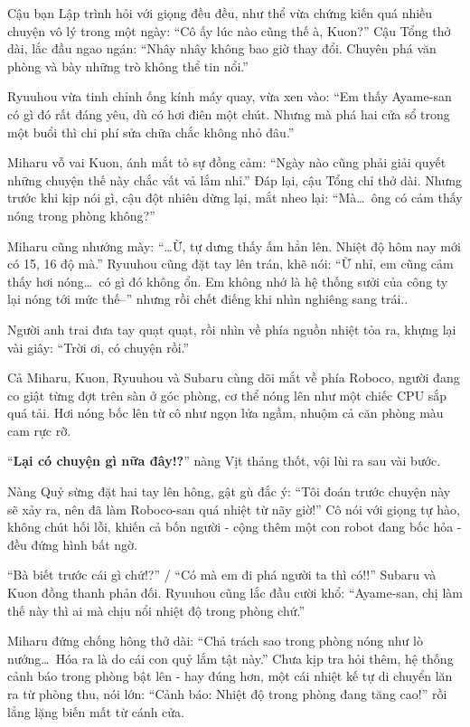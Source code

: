 \documentclass[../main.tex]{subfiles}
\begin{document}

Cậu bạn Lập trình hỏi với giọng đều đều, như thể vừa chứng kiến quá nhiều chuyện vô lý trong một ngày: ``Cô ấy lúc nào cũng thế à, Kuon?'' Cậu Tổng thở dài, lắc đầu ngao ngán: ``Nhây nhây không bao giờ thay đổi. Chuyên phá văn phòng và bày những trò không thể tin nổi.''

Ryuuhou vừa tinh chỉnh ống kính máy quay, vừa xen vào: ``Em thấy Ayame-san có gì đó rất đáng yêu, dù có hơi điên một chút. Nhưng mà phá hai cửa sổ trong một buổi thì chi phí sửa chữa chắc không nhỏ đâu.''

Miharu vỗ vai Kuon, ánh mắt tỏ sự đồng cảm: ``Ngày nào cũng phải giải quyết những chuyện thế này chắc vất vả lắm nhỉ.'' Đáp lại, cậu Tổng chỉ thở dài. Nhưng trước khi kịp nói gì, cậu đột nhiên dừng lại, mắt nheo lại: ``Mà\dots\ ông có cảm thấy nóng trong phòng không?''

Miharu cũng nhướng mày: ``\dots Ừ, tự dưng thấy ấm hẳn lên. Nhiệt độ hôm nay mới có 15, 16 độ mà.'' Ryuuhou cũng đặt tay lên trán, khẽ nói: ``Ừ nhỉ, em cũng cảm thấy hơi nóng\dots\ có gì đó không ổn. Em không nhớ là hệ thống sưởi của công ty lại nóng tới mức thế--'' nhưng rồi chết điếng khi nhìn nghiêng sang trái..

Người anh trai đưa tay quạt quạt, rồi nhìn về phía nguồn nhiệt tỏa ra, khựng lại vài giây: ``Trời ơi, có chuyện rồi.''

Cả Miharu, Kuon, Ryuuhou và Subaru cùng dõi mắt về phía Roboco, người đang co giật từng đợt trên sàn ở góc phòng, cơ thể nóng lên như một chiếc CPU sắp quá tải. Hơi nóng bốc lên từ cô như ngọn lửa ngầm, nhuộm cả căn phòng màu cam rực rỡ.


``\textbf{Lại có chuyện gì nữa đây!?}'' nàng Vịt thảng thốt, vội lùi ra sau vài bước.

Nàng Quỷ sừng đặt hai tay lên hông, gật gù đắc ý: ``Tôi đoán trước chuyện này sẽ xảy ra, nên đã làm Roboco-san quá nhiệt từ nãy giờ!'' Cô nói với giọng tự hào, không chút hối lỗi, khiến cả bốn người - cộng thêm một con robot đang bốc hỏa - đều đứng hình bất ngờ.

``Bà biết trước cái gì chứ!?'' / ``Có mà em đi phá người ta thì có!!'' Subaru và Kuon đồng thanh phản đối. Ryuuhou cũng lắc đầu cười khổ: ``Ayame-san, chị làm thế này thì ai mà chịu nổi nhiệt độ trong phòng chứ.''

Miharu đứng chống hông thở dài: ``Chả trách sao trong phòng nóng như lò nướng\dots\ Hóa ra là do cái con quỷ lắm tật này.'' Chưa kịp tra hỏi thêm, hệ thống cảnh báo trong phòng bật lên - hay đúng hơn, một cái nhiệt kế tự di chuyển lăn ra từ phòng thu, nói lớn: ``Cảnh báo: Nhiệt độ trong phòng đang tăng cao!'' rồi lẳng lặng biến mất từ cánh cửa.
\end{document}
